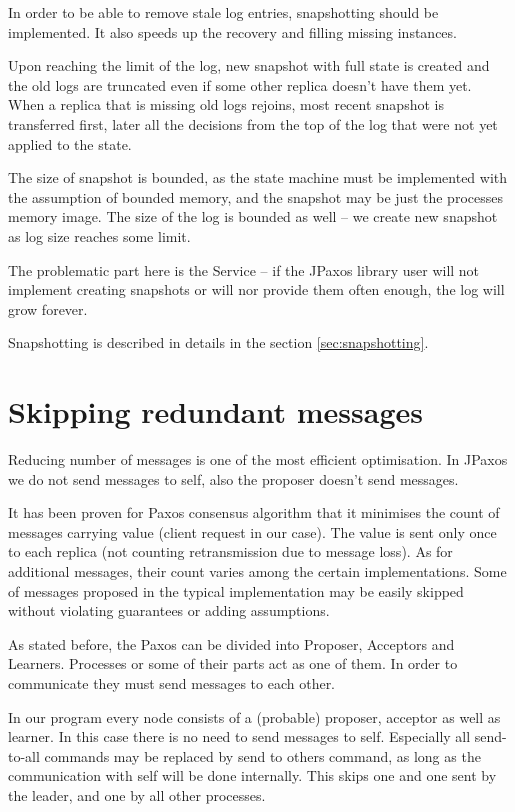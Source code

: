 In order to be able to remove stale log entries, snapshotting should be implemented. It also speeds up the recovery and filling missing instances.

Upon reaching the limit of the log, new snapshot with full state is created and the old logs are truncated even if some other replica doesn't have them yet. When a replica that is missing old logs rejoins, most recent snapshot is transferred first, later all the decisions from the top of the log that were not yet applied to the state.

The size of snapshot is bounded, as the state machine must be implemented with the assumption of bounded memory, and the snapshot may be just the processes memory image. The size of the log is bounded as well -- we create new snapshot as log size reaches some limit.

The problematic part here is the Service -- if the JPaxos library user will not implement creating snapshots or will nor provide them often enough, the log will grow forever.

Snapshotting is described in details in the section \ref{sec:snapshotting}.

\section{Skipping redundant messages}
Reducing number of messages is one of the most efficient optimisation. In JPaxos we do not send messages to self, also the proposer doesn't send \accept messages.

It has been proven for Paxos consensus algorithm that it minimises the count of messages carrying value (client request in our case). The value is sent only once to each replica (not counting retransmission due to message loss). As for additional messages, their count varies among the certain implementations. Some of messages proposed in the typical implementation may be easily skipped without violating guarantees or adding assumptions.


As stated before, the Paxos can be divided into Proposer, Acceptors and Learners. Processes or some of their parts act as one of them. In order to communicate they must send messages to each other.

In our program every node consists of a (probable) proposer, acceptor as well as learner. In this case there is no need to send messages to self. Especially all send-to-all commands may be replaced by send to others command, as long as the communication with self will be done internally. This skips one \accept and one \propose sent by the leader, and one \accept by all other processes.

